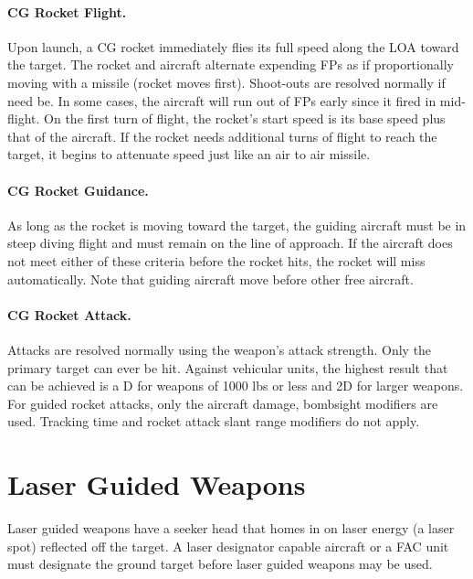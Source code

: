 \paragraph{CG Rocket Flight.} Upon launch, a CG rocket immediately flies its full speed along the LOA toward the target. The rocket and aircraft alternate expending FPs as if proportionally moving with a missile (rocket moves first). Shoot-outs are resolved normally if need be. In some cases, the aircraft will run out of FPs early since it fired in mid-flight. On the first turn of flight, the rocket's start speed is its base speed plus that of the aircraft. If the rocket needs additional turns of flight to reach the target, it begins to attenuate speed just like an air to air missile.

\paragraph{CG Rocket Guidance.} As long as the rocket is moving toward the target, the guiding aircraft must be in steep diving flight and must remain on the line of approach. If the aircraft does not meet either of these criteria before the rocket hits, the rocket will miss automatically. Note that guiding aircraft move before other free aircraft.

\paragraph{CG Rocket Attack.} Attacks are resolved normally using the weapon's attack strength. Only the primary target can ever be hit. Against vehicular units, the highest result that can be achieved is a D for weapons of 1000 lbs or less and 2D for larger weapons. For guided rocket attacks, only the aircraft damage, bombsight modifiers are used. Tracking time and rocket attack slant range modifiers do not apply.


\section{Laser Guided Weapons}
\label{rule:laser-guided-weapons}

Laser guided weapons have a seeker head that homes in on laser energy (a laser spot) reflected off the target. A laser designator capable aircraft or a FAC unit must designate the ground target before laser guided weapons may be used.

